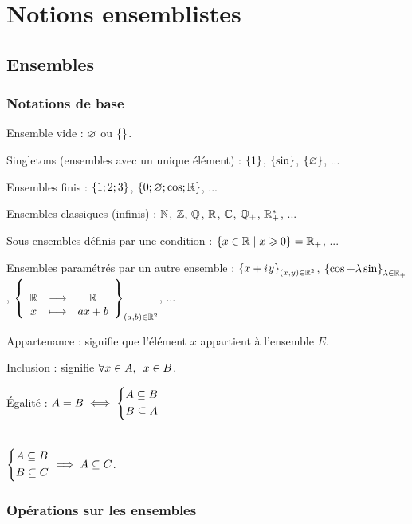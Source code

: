 \chapter{Notions ensemblistes}

\minitoc

\section{Ensembles}

\subsection{Notations de base}

Ensemble vide : \(\varnothing\) ou \(\left\lbrace\right\rbrace\).

Singletons (ensembles avec un unique élément) : \(\left\lbrace1\right\rbrace\), \(\left\lbrace\sin\right\rbrace\), \(\left\lbrace\varnothing\right\rbrace\), ...

Ensembles finis : \(\left\lbrace1;2;3\right\rbrace\), \(\left\lbrace0;\varnothing;\cos;\mathbb{R}\right\rbrace\), ...

Ensembles classiques (infinis) : \(\mathbb{N}\), \(\mathbb{Z}\), \(\mathbb{Q}\), \(\mathbb{R}\), \(\mathbb{C}\), \(\mathbb{Q}_+\), \(\mathbb{R}_+^*\), ...

Sous-ensembles définis par une condition : \(\left\lbrace x\in\mathbb{R}\;\middle|\; x\geqslant0\right\rbrace=\mathbb{R}_+\), ...

Ensembles paramétrés par un autre ensemble : \(\left\lbrace x+i\mkern1mu y\right\rbrace_{\left(x,y\right)\in\mathbb{R}^2}\), \(\left\lbrace\cos+\lambda\sin\right\rbrace_{\lambda\in\mathbb{R}_+}\), \(\left\lbrace\begin{array}[t]{ccc}\mathbb{R} & \longrightarrow & \mathbb{R} \\ x & \longmapsto & ax+b\end{array}\right\rbrace_{\left(a,b\right)\in\mathbb{R}^2}\), ...

Appartenance :  signifie que l'élément \(x\) appartient à l'ensemble \(E\).

Inclusion :  signifie \(\quantifs{\forall x\in A}x\in B\).

Égalité : \(A=B\iff\begin{dcases}A\subseteq B \\ B\subseteq A\end{dcases}\)

\begin{rem}~\\
\(\begin{dcases}A\subseteq B \\ B\subseteq C\end{dcases}\implies A\subseteq C\).
\end{rem}

\subsection{Opérations sur les ensembles}

